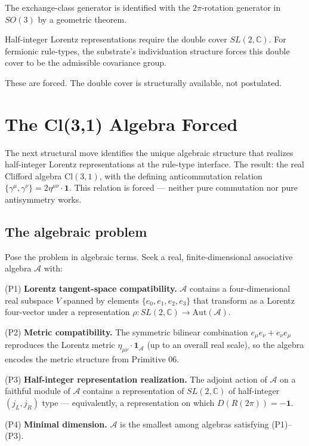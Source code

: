 \documentclass[11pt,a4paper]{article}
\begin{document}
The exchange-class generator is identified with the $2\pi$-rotation generator in $SO(3)$ by a geometric theorem.

Half-integer Lorentz representations require the double cover $SL(2, \mathbb{C})$. For fermionic rule-types, the substrate's individuation structure forces this double cover to be the admissible covariance group.

These are forced. The double cover is structurally available, not postulated.

\section{The Cl(3,1) Algebra Forced}

The next structural move identifies the unique algebraic structure that realizes half-integer Lorentz representations at the rule-type interface. The result: the real Clifford algebra $\mathrm{Cl}(3,1)$, with the defining anticommutation relation $\{\gamma^\mu, \gamma^\nu\} = 2\eta^{\mu\nu}\cdot\mathbf{1}$. This relation is forced --- neither pure commutation nor pure antisymmetry works.

\subsection{The algebraic problem}

Pose the problem in algebraic terms. Seek a real, finite-dimensional associative algebra $\mathcal{A}$ with:

(P1) \textbf{Lorentz tangent-space compatibility.} $\mathcal{A}$ contains a four-dimensional real subspace $V$ spanned by elements $\{e_0, e_1, e_2, e_3\}$ that transform as a Lorentz four-vector under a representation $\rho: SL(2, \mathbb{C}) \to \mathrm{Aut}(\mathcal{A})$.

(P2) \textbf{Metric compatibility.} The symmetric bilinear combination $e_\mu e_\nu + e_\nu e_\mu$ reproduces the Lorentz metric $\eta_{\mu\nu}\cdot\mathbf{1}_\mathcal{A}$ (up to an overall real scale), so the algebra encodes the metric structure from Primitive 06.

(P3) \textbf{Half-integer representation realization.} The adjoint action of $\mathcal{A}$ on a faithful module of $\mathcal{A}$ contains a representation of $SL(2, \mathbb{C})$ of half-integer $(j_L, j_R)$ type --- equivalently, a representation on which $D(R(2\pi)) = -\mathbf{1}$.

(P4) \textbf{Minimal dimension.} $\mathcal{A}$ is the smallest among algebras satisfying (P1)--(P3).
\end{document}
